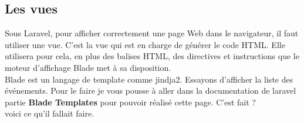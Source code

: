 \documentclass[12pt,a4paper]{article}
\begin{document}
\subsection{Les vues}
Sous Laravel, pour afficher correctement une page Web dans le navigateur, il faut utiliser une vue. C'est la vue qui est en charge de générer le code HTML. Elle utilisera pour cela, en plus des balises HTML, des directives et instructions que le moteur d'affichage Blade met à sa disposition.\\
Blade est un langage de template comme jindja2. 
Essayons d'afficher la liste des événements. Pour le faire je vous pousse à aller dans la documentation
de laravel partie \textbf{Blade Templates} pour pouvoir réalisé cette page.
C'est fait ?\\

voici ce qu'il fallait faire.
\end{document}
